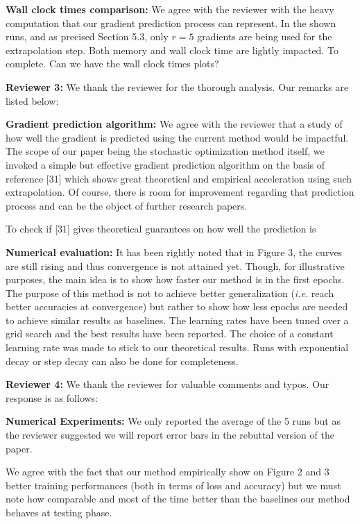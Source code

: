 \documentclass{article}
\begin{document}
\textbf{Wall clock times comparison:}
We agree with the reviewer with the heavy computation that our gradient prediction process can represent.
In the shown runs, and as precised Section 5.3, only $r=5$ gradients are being used for the extrapolation step.
Both memory and wall clock time are lightly impacted.
{\color{red}  To complete. Can we have the wall clock times plots?}


\textbf{\textcolor{green!50!black}{Reviewer 3:}} We thank the reviewer for the thorough analysis. Our remarks are listed below:

\textbf{Gradient prediction algorithm:}
We agree with the reviewer that a study of how well the gradient is predicted using the current method would be impactful.
The scope of our paper being the stochastic optimization method itself, we invoked a simple but effective gradient prediction algorithm on the basis of reference [31] which shows great theoretical and empirical acceleration using such extrapolation.
Of course, there is room for improvement regarding that prediction process and can be the object of further research papers.

{\color{red}  To check if [31] gives theoretical guarantees on how well the prediction is}

\textbf{Numerical evaluation:} It has been rightly noted that in Figure 3, the curves are still rising and thus convergence is not attained yet.
Though, for illustrative purposes, the main idea is to show how faster our method is in the first epochs.
The purpose of this method is not to achieve better generalization (\textit{i.e.} reach better accuracies at convergence) but rather to show how less epochs are needed to achieve similar results as baselines.
The learning rates have been tuned over a grid search and the best results have been reported. The choice of a constant learning rate was made to stick to our theoretical results.
Runs with exponential decay or step decay can also be done for completeness.


\textbf{\textcolor{yellow!50!black}{Reviewer 4:}} We thank the reviewer for valuable comments and typos. Our response is as follows:

\textbf{Numerical Experiments:}
We only reported the average of the 5 runs but as the reviewer suggested we will report error bars in the rebuttal version of the paper.

We agree with the fact that our method empirically show on Figure 2 and 3 better training performances (both in terms of loss and accuracy) but we must note how comparable and most of the time better than the baselines our method behaves at testing phase.
\end{document}
